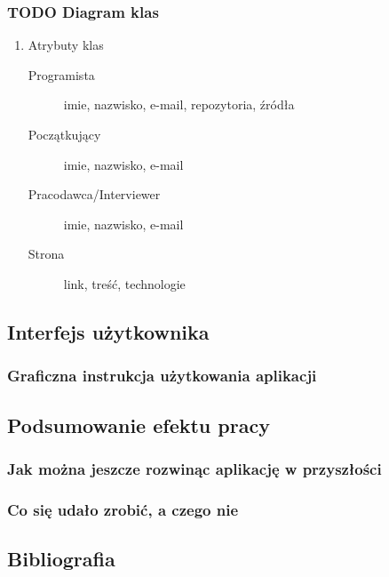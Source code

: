 \documentclass[11pt]{article}
\begin{document}
\subsubsection{{\bfseries\sffamily TODO} Diagram klas}
\label{sec:org0e4607a}
\begin{enumerate}
\item Atrybuty klas
\label{sec:orgccc9222}
\begin{description}
\item[{Programista}] imie, nazwisko, e-mail, repozytoria, źródła
\item[{Początkujący}] imie, nazwisko, e-mail
\item[{Pracodawca/Interviewer}] imie, nazwisko, e-mail
\item[{Strona}] link, treść, technologie
\end{description}
\end{enumerate}

\subsection{Interfejs użytkownika}
\label{sec:orgc9678b8}
\subsubsection{Graficzna instrukcja użytkowania aplikacji}
\label{sec:org1f713c5}
\subsection{Podsumowanie efektu pracy}
\label{sec:org3ef8223}
\subsubsection{Jak można jeszcze rozwinąc aplikację w przyszłości}
\label{sec:orgea16a5b}
\subsubsection{Co się udało zrobić, a czego nie}
\label{sec:orgcbea82f}
\subsection{Bibliografia}
\label{sec:orgdee7b7e}
\end{document}
